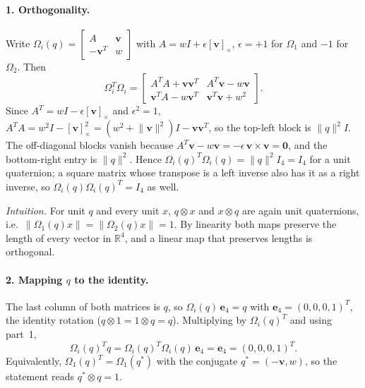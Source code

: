 \documentclass[a4paper]{tufte-handout}
\begin{document}
\paragraph{1. Orthogonality.}
Write $\Omega_i(q) = \left[\begin{smallmatrix} A & \bm v\\ -\bm v^T & w\end{smallmatrix}\right]$
with $A = wI + \epsilon[\bm v]_\times$, $\epsilon = +1$ for $\Omega_1$ and
$-1$ for $\Omega_2$. Then
\begin{equation*}
\Omega_i^T\Omega_i =
\begin{bmatrix} A^T A + \bm v\bm v^T & A^T\bm v - w\bm v\\ \bm v^T A - w\bm v^T & \bm v^T\bm v + w^2 \end{bmatrix}.
\end{equation*}
Since $A^T = wI - \epsilon[\bm v]_\times$ and $\epsilon^2 = 1$,
$A^T A = w^2 I - [\bm v]_\times^2 = (w^2 + \lVert\bm v\rVert^2) I - \bm v\bm v^T$,
so the top-left block is $\lVert q\rVert^2 I$.
The off-diagonal blocks vanish because
$A^T\bm v - w\bm v = -\epsilon\,\bm v \times \bm v = \bm 0$,
and the bottom-right entry is $\lVert q\rVert^2$.
Hence $\Omega_i(q)^T\Omega_i(q) = \lVert q\rVert^2 I_4 = I_4$ for a unit
quaternion; a square matrix whose transpose is a left inverse also has it as a
right inverse, so $\Omega_i(q)\Omega_i(q)^T = I_4$ as well.

\emph{Intuition.} For unit $q$ and every unit $x$, $q \otimes x$ and
$x \otimes q$ are again unit quaternions, i.e.\
$\lVert\Omega_1(q)x\rVert = \lVert\Omega_2(q)x\rVert = 1$.
By linearity both maps preserve the length of every vector in $\mathbb{R}^4$,
and a linear map that preserves lengths is orthogonal.

\paragraph{2. Mapping $q$ to the identity.}
The last column of both matrices is $q$, so
$\Omega_i(q)\,\bm e_4 = q$ with $\bm e_4 = (0, 0, 0, 1)^T$, the identity
rotation ($q \otimes 1 = 1 \otimes q = q$).
Multiplying by $\Omega_i(q)^T$ and using part~1,
\begin{equation*}
\Omega_i(q)^T q = \Omega_i(q)^T\Omega_i(q)\,\bm e_4 = \bm e_4 = (0, 0, 0, 1)^T .
\end{equation*}
Equivalently, $\Omega_1(q)^T = \Omega_1(q^*)$ with the conjugate
$q^* = (-\bm v, w)$, so the statement reads $q^* \otimes q = 1$.
\end{document}
